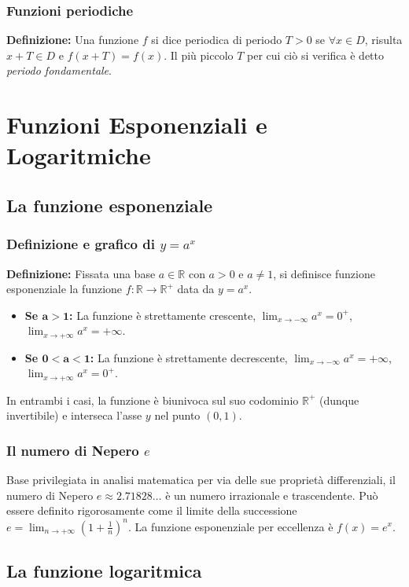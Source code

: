 \subsubsection{Funzioni periodiche}
\textbf{Definizione:} Una funzione $f$ si dice periodica di periodo $T > 0$ se $\forall x \in D$, risulta $x+T \in D$ e $f(x+T) = f(x)$. Il più piccolo $T$ per cui ciò si verifica è detto \textit{periodo fondamentale}.

\section{Funzioni Esponenziali e Logaritmiche}
\subsection{La funzione esponenziale}
\subsubsection{Definizione e grafico di $y = a^x$}
\textbf{Definizione:} Fissata una base $a \in \mathbb{R}$ con $a > 0$ e $a \neq 1$, si definisce funzione esponenziale la funzione $f: \mathbb{R} \to \mathbb{R}^+$ data da $y = a^x$.
\begin{itemize}
    \item \textbf{Se $\mathbf{a > 1}$:} La funzione è strettamente crescente, $\lim_{x \to -\infty} a^x = 0^+$, $\lim_{x \to +\infty} a^x = +\infty$.
    \item \textbf{Se $\mathbf{0 < a < 1}$:} La funzione è strettamente decrescente, $\lim_{x \to -\infty} a^x = +\infty$, $\lim_{x \to +\infty} a^x = 0^+$.
\end{itemize}
In entrambi i casi, la funzione è biunivoca sul suo codominio $\mathbb{R}^+$ (dunque invertibile) e interseca l'asse $y$ nel punto $(0,1)$.

\subsubsection{Il numero di Nepero $e$}
Base privilegiata in analisi matematica per via delle sue proprietà differenziali, il numero di Nepero $e \approx 2.71828\dots$ è un numero irrazionale e trascendente. Può essere definito rigorosamente come il limite della successione $e = \lim_{n \to +\infty} \left(1+\frac{1}{n}\right)^n$. La funzione esponenziale per eccellenza è $f(x) = e^x$.

\subsection{La funzione logaritmica}
